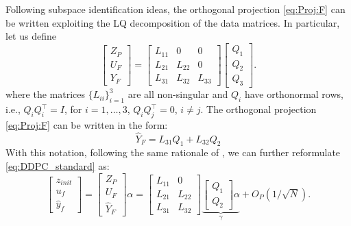 \documentclass[letterpaper, 10 pt, conference]{ieeeconf}  %
\begin{document}
Following subspace identification \cite{Vanov-book} ideas,  the orthogonal projection \eqref{eq:Proj:F} can be written  exploiting the LQ decomposition of the data matrices. In particular, let us define 
\begin{equation}\label{eq:LQ}
	\begin{bmatrix}
		Z_{P}\\U_{F}\\ Y_{F}
	\end{bmatrix}=
	\begin{bmatrix}
		L_{11} & 0 & 0  \\
		L_{21} & L_{22} &  0\\
		L_{31} & L_{32} & L_{33} 
	\end{bmatrix}
	\begin{bmatrix}
		Q_{1}\\
		Q_{2}\\
		Q_{3}
	\end{bmatrix}.
\end{equation}
where the matrices $\{L_{ii}\}_{i=1}^{3}$ are all non-singular and $Q_{i}$ have orthonormal rows, i.e., $Q_{i}Q_{i}^{\top}=I$, for $i=1,\ldots,3$, $Q_i Q_j^\top = 0$, $i\neq j$. The orthogonal projection 
\eqref{eq:Proj:F}  can be written in the form:
$$
\hat Y_F = L_{31} Q_1 + L_{32}Q_2
$$
With this notation, following the same rationale of \cite{breschi2022role,breschi2022uncertainty}, we can further reformulate \eqref{eq:DDPC_standard} as:
\begin{equation}\label{eq:LQ_prediction}
	\begin{bmatrix}z_{init}\\u_{f}\\ \hat y_{f}		
	\end{bmatrix}=\begin{bmatrix}
		Z_{P}\\U_{F}\\ \hat Y_{F}
	\end{bmatrix}\alpha=
	\begin{bmatrix}
		L_{11} & 0   \\
		L_{21} & L_{22} \\
		L_{31} & L_{32} 
	\end{bmatrix}
	\underbrace{\begin{bmatrix}
			Q_{1}\\
			Q_{2}
		\end{bmatrix}\alpha}_{\gamma} + O_P(1/
	\sqrt{N}).
\end{equation}
\end{document}
